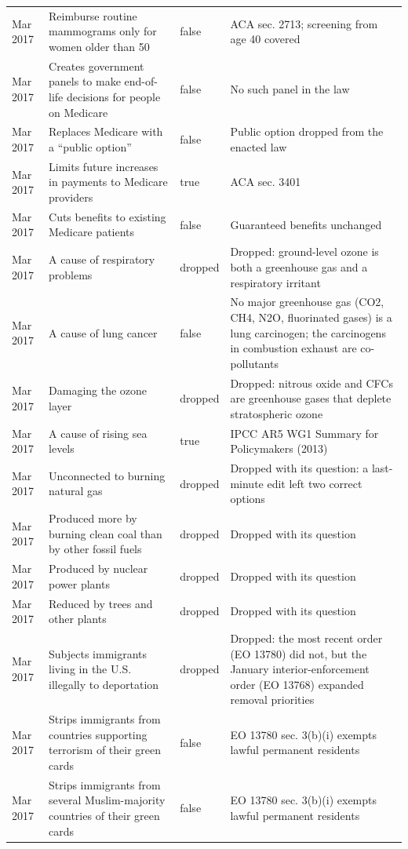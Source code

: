 \begin{longtable}{lp{4.8cm}lp{7cm}}
Mar 2017 & Reimburse routine mammograms only for women older than 50 & false & ACA sec. 2713; screening from age 40 covered \\
Mar 2017 & Creates government panels to make end-of-life decisions for people on Medicare & false & No such panel in the law \\
Mar 2017 & Replaces Medicare with a ``public option'' & false & Public option dropped from the enacted law \\
Mar 2017 & Limits future increases in payments to Medicare providers & true & ACA sec. 3401 \\
Mar 2017 & Cuts benefits to existing Medicare patients & false & Guaranteed benefits unchanged \\
Mar 2017 & A cause of respiratory problems & dropped & Dropped: ground-level ozone is both a greenhouse gas and a respiratory irritant \\
Mar 2017 & A cause of lung cancer & false & No major greenhouse gas (CO2, CH4, N2O, fluorinated gases) is a lung carcinogen; the carcinogens in combustion exhaust are co-pollutants \\
Mar 2017 & Damaging the ozone layer & dropped & Dropped: nitrous oxide and CFCs are greenhouse gases that deplete stratospheric ozone \\
Mar 2017 & A cause of rising sea levels & true & IPCC AR5 WG1 Summary for Policymakers (2013) \\
Mar 2017 & Unconnected to burning natural gas & dropped & Dropped with its question: a last-minute edit left two correct options \\
Mar 2017 & Produced more by burning clean coal than by other fossil fuels & dropped & Dropped with its question \\
Mar 2017 & Produced by nuclear power plants & dropped & Dropped with its question \\
Mar 2017 & Reduced by trees and other plants & dropped & Dropped with its question \\
Mar 2017 & Subjects immigrants living in the U.S. illegally to deportation & dropped & Dropped: the most recent order (EO 13780) did not, but the January interior-enforcement order (EO 13768) expanded removal priorities \\
Mar 2017 & Strips immigrants from countries supporting terrorism of their green cards & false & EO 13780 sec. 3(b)(i) exempts lawful permanent residents \\
Mar 2017 & Strips immigrants from several Muslim-majority countries of their green cards & false & EO 13780 sec. 3(b)(i) exempts lawful permanent residents \\

\end{longtable}
